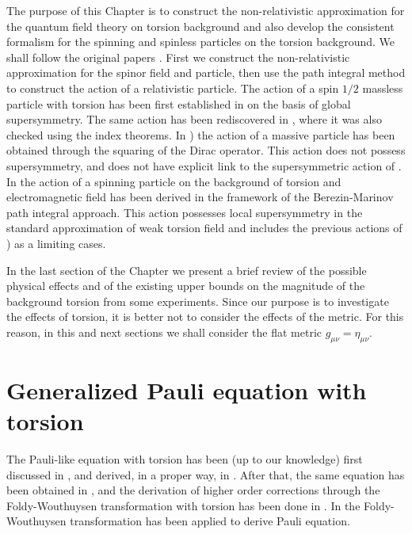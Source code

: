 The purpose of this Chapter
is to construct the non-relativistic approximation for the quantum
field theory on  torsion background and also develop the consistent
formalism for the  spinning and spinless particles on the 
torsion background. We shall follow the original papers
\cite{babush,rysh,gegi}. First we construct the non-relativistic 
approximation for the spinor field and particle, then use the
path integral method to construct the action of a relativistic 
particle. The action of a spin $1/2$
massless particle with torsion has been first established
in \cite{rumpf} on the basis of global supersymmetry. The same 
action has been rediscovered in \cite{RieHo96}, where it was
also checked using the index theorems. In \cite{PeeWa99}) 
the action of a massive particle has been obtained through the
squaring of the Dirac operator. This action does not possess
supersymmetry, and does not have explicit link to the supersymmetric
action of \cite{rumpf,RieHo96}.  In \cite{gegi} the action
of a spinning particle on the background of torsion and electromagnetic
field has been derived in the framework of the Berezin-Marinov
path integral approach. This action possesses local supersymmetry
in the standard approximation of weak torsion field and includes
the previous actions of \cite{rumpf,RieHo96,PeeWa99}) 
 as a limiting cases.  

In the last section of the Chapter we present 
a brief review of the possible physical effects and of the existing 
upper bounds on the magnitude of the background torsion from some
experiments. Since our purpose is to investigate the effects of 
torsion, it is better not to consider the effects of the metric. 
For this reason, in this and next sections we shall consider the
flat metric $g_{\mu\nu} = \eta_{\mu\nu}$.

\section{Generalized Pauli equation with torsion}

The Pauli-like equation with torsion has been (up to our knowledge)
first discussed in \cite{prosab}, and derived, in a proper way, 
in \cite{babush}. After that, the same equation has been obtained in
\cite{hammond,singh,lamme}, and the derivation of higher order 
corrections through the Foldy-Wouthuysen transformation with torsion 
has been done in \cite{rysh}. In \cite{lamme} the Foldy-Wouthuysen 
transformation has been applied to derive Pauli equation. 

